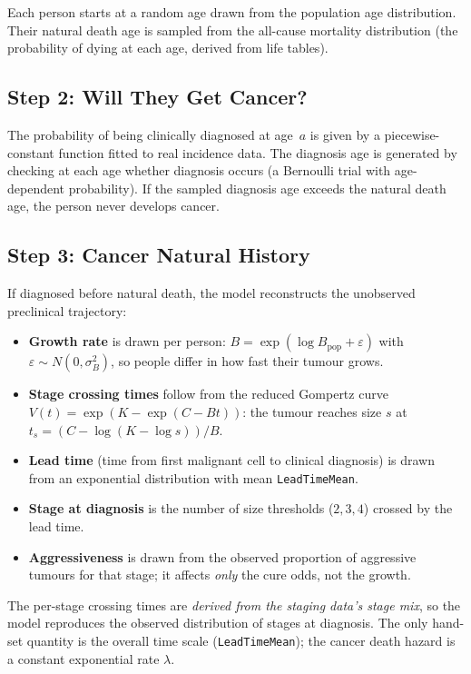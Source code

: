 \documentclass[12pt,a4paper]{article}
\begin{document}
Each person starts at a random age drawn from the population age distribution. Their natural death age is sampled from the all-cause mortality distribution (the probability of dying at each age, derived from life tables).

\subsection{Step 2: Will They Get Cancer?}

The probability of being clinically diagnosed at age~$a$ is given by a piecewise-constant function fitted to real incidence data. The diagnosis age is generated by checking at each age whether diagnosis occurs (a Bernoulli trial with age-dependent probability). If the sampled diagnosis age exceeds the natural death age, the person never develops cancer.

\subsection{Step 3: Cancer Natural History}

If diagnosed before natural death, the model reconstructs the unobserved preclinical trajectory:

\begin{itemize}[nosep]
    \item \textbf{Growth rate} is drawn per person: $B = \exp(\log B_{\text{pop}} + \varepsilon)$ with $\varepsilon \sim N(0, \sigma_B^2)$, so people differ in how fast their tumour grows.
    \item \textbf{Stage crossing times} follow from the reduced Gompertz curve $V(t) = \exp(K - \exp(C - B t))$: the tumour reaches size $s$ at $t_s = (C - \log(K - \log s))/B$.
    \item \textbf{Lead time} (time from first malignant cell to clinical diagnosis) is drawn from an exponential distribution with mean \texttt{LeadTimeMean}.
    \item \textbf{Stage at diagnosis} is the number of size thresholds ($2,3,4$) crossed by the lead time.
    \item \textbf{Aggressiveness} is drawn from the observed proportion of aggressive tumours for that stage; it affects \emph{only} the cure odds, not the growth.
\end{itemize}

The per-stage crossing times are \emph{derived from the staging data's stage mix}, so the model reproduces the observed distribution of stages at diagnosis. The only hand-set quantity is the overall time scale (\texttt{LeadTimeMean}); the cancer death hazard is a constant exponential rate $\lambda$.
\end{document}
